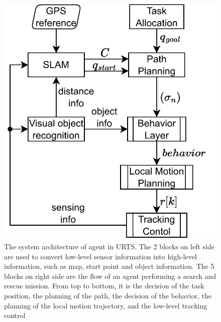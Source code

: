 \documentclass{ieeeaccess}
\begin{document}
\begin{figure}[htbp]
\centering
\includegraphics[scale=.5]{fig/sys.pdf}\caption{The system architecture of agent in URTS. The 2 blocks on left side are used to convert low-level sensor information into high-level information, such as map, start point and object information. The 5 blocks on right side are the flow of an agent performing a search and rescue mission. From top to bottom, it is the decision of the task position, the planning of the path, the decision of the behavior, the planning of the local motion trajectory, and the low-level tracking control}%
\label{fig:sys}
\end{figure}
\end{document}
